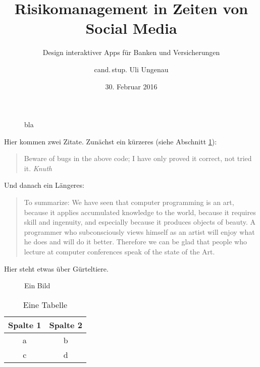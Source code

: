\documentclass{scrreprt}
\begin{document}
	\titlehead{\Large Universität Schlauenheim}
	\subject{Masterarbeit}
	\title{Risikomanagement in Zeiten von Social Media}
	\subtitle{Design interaktiver Apps für Banken und Versicherungen}
	\author{cand.\,stup. Uli Ungenau}
	\date{30. Februar 2016}
	\publishers{Betreut durch Prof.\,Dr.\,rer.\,stup. Naseweis}
	\dedication{Für meine Mama.}

	\maketitle
	
	\begin{abstract}
		\noindent\blindtext
	\end{abstract}
	
	\tableofcontents
	\listoffigures
	\listoftables
	
	
	\blinddocument

\begin{figure}

	\caption{bla	\label{fig:ende}}

\end{figure}
	

	Hier kommen zwei Zitate. Zunächst ein kürzeres (siehe Abschnitt \cref{fig:ende}):
	\begin{quote}
		Beware of bugs in the above code; I have only proved it correct, not tried it. \hfill\textit{Knuth}
	\end{quote}
	Und danach ein Längeres:
	\begin{quotation}
		To summarize: We have seen that computer programming is an art, because it applies accumulated knowledge to the world, because it requires skill and ingenuity, and especially because it produces objects of beauty. A programmer who subconsciously views himself as an artist will enjoy what he does and will do it better. Therefore we can be glad that people who lecture at computer conferences speak of the state of the Art. \cite{knuth74}
	\end{quotation}
	
	Hier steht etwas über Gürteltiere. \cite{autor88}  \blindtext[3]
	
	\begin{figure}
		\centering
		\caption{Ein Bild}
		\label{fig:dasbild}
	\end{figure}
	
	\begin{table}
		\centering
		\begin{tabular}{cc}
			\toprule
			Spalte 1 & Spalte 2\\
			\midrule
			a & b \\
			c & d
		\end{tabular}
		\caption{Eine Tabelle}
		\label{tab:dietabelle}
	\end{table}
	
\end{document}
